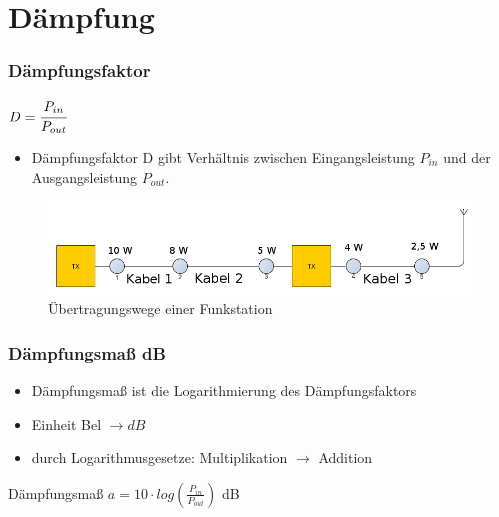 

\subtitle{Technik Klasse E 10: \\
          Dezibel, Dämpfung \& Kabel \\[2em]}
\date{Stand 10.12.2015}



\section*{Dämpfung}

\begin{frame}
\frametitle{Dämpfungsfaktor}
\begin{center}
\begin{minipage}{0.3\textwidth}
	\huge{$ D = \cfrac{P_{in}}{P_{out}}$}
\end{minipage}
\begin{minipage}{0.6\textwidth}
\begin{itemize}
	\item Dämpfungsfaktor D gibt Verhältnis zwischen Eingangsleistung $P_{in}$
          und der Ausgangsleistung $P_{out}$.
\end{itemize}	
\end{minipage}
\vspace{1cm}	
\begin{figure}
\includegraphics[scale=0.35]{e10/ubertragung.png}
\caption{Übertragungswege einer Funkstation}
\end{figure}
\end{center}
\end{frame}


\begin{frame}
\frametitle{Dämpfungsmaß dB}
  \begin{itemize}
    \item Dämpfungsmaß ist die Logarithmierung des Dämpfungsfaktors
    \item Einheit Bel $\rightarrow dB$ 
    \item durch Logarithmusgesetze: Multiplikation $\rightarrow$ Addition
  \end{itemize}
  \vspace{0.5cm}
  \begin{block}{Dämpfungsmaß}
    \Huge{$a = 10 \cdot log(\frac{P_{in}}{P_{out}})$ dB}
  \end{block}
\end{frame}

